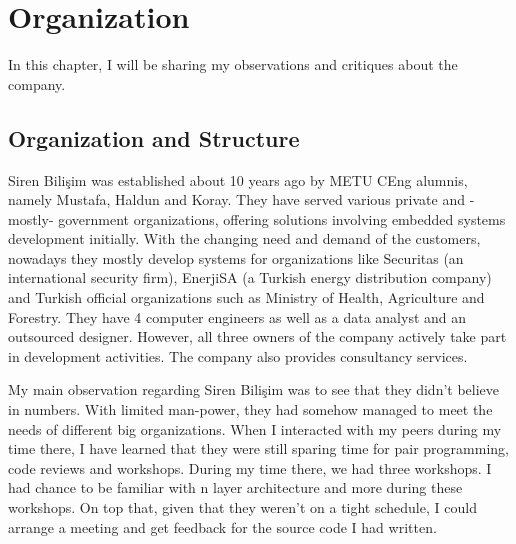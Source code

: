 \chapter{Organization}
In this chapter, I will be sharing my observations and critiques about the 
company.
\section{Organization and Structure}
Siren Bilişim was established about 10 years ago by METU CEng alumnis, namely 
Mustafa, Haldun and Koray. They have served various private and -mostly- 
government organizations, offering solutions involving embedded systems 
development initially. With the changing need and demand of the customers, 
nowadays they mostly develop systems for organizations like Securitas (an 
international security firm), EnerjiSA (a Turkish energy distribution company) 
and Turkish official organizations such as Ministry of Health, Agriculture and 
Forestry. They have 4 computer engineers as well as a data analyst and an 
outsourced designer. However, all three owners of the company actively take 
part in development activities. The company also provides consultancy services.
\par
My main observation regarding Siren Bilişim was to see that they didn't 
believe in numbers. With limited man-power, they had somehow managed to meet 
the needs of different big organizations. When I interacted with my peers 
during my time there, I have learned that they were still sparing time 
for pair programming, code reviews and workshops. During my time there, 
we had three workshops. I had chance to be familiar with n layer architecture 
and more during these workshops. On top that, given that they weren't on a 
tight schedule, I could arrange a meeting and get feedback for the source 
code I had written.

